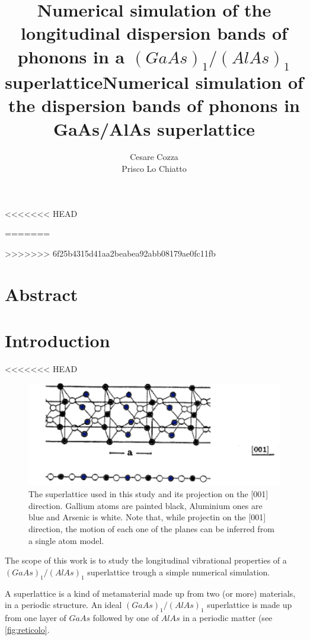 \documentclass{article}
\begin{document}
 
	
	\author{Cesare Cozza \\ Prisco Lo Chiatto }
<<<<<<< HEAD
	\title{Numerical simulation of the longitudinal dispersion bands of phonons in a $(GaAs)_1/(AlAs)_1$ superlattice}
=======
	\title{Numerical simulation of the dispersion bands of phonons in GaAs/AlAs superlattice}
>>>>>>> 6f25b4315d41aa2beabea92abb08179ae0fc11fb
	
	\maketitle
    \newpage
    
    
\section{Abstract}




\section{Introduction}
<<<<<<< HEAD
\begin{figure}
	\centering
	\includegraphics[scale=0.3]{reticolo.jpg}
	\caption{The superlattice used in this study and its projection on the [001] direction. Gallium atoms are painted black, Aluminium ones are blue and Arsenic is white. Note that, while projectin on the [001] direction, the motion of each one of the planes can be inferred from a single atom model.}
	\label{fig:reticolo}
\end{figure}
The scope of this work is to study the longitudinal vibrational properties of a $(GaAs)_1/(AlAs)_1$ superlattice trough a simple numerical simulation.\medskip

A superlattice is a kind of metamaterial made up from two (or more) materials, in a periodic structure. An ideal $(GaAs)_1/(AlAs)_1$ superlattice is made up from one layer of $GaAs$ followed by one of $AlAs$ in a periodic matter (see \autoref{fig:reticolo}.\smallskip
\end{document}
